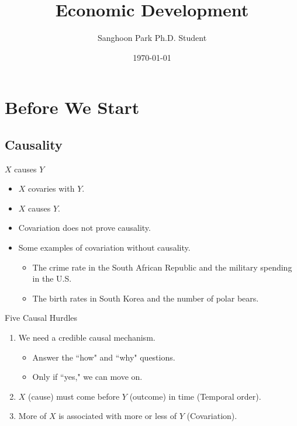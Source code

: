 \documentclass[xcolor=dvipsnames]{beamer}
\title{Economic Development}
\date{\today}
\author[Sanghoon Park]{Sanghoon Park \newline \newline  \footnotesize{Ph.D. Student}}
\institute[UofSC]{Department of Political Science}
\begin{document}

	
	\begin{frame}
		\titlepage
	\end{frame}
	\begin{frame}
		\tableofcontents
	\end{frame}

	
	\section{Before We Start}
	\subsection{Causality}
	\begin{frame}[fragile]{$X$ causes $Y$}
	\begin{itemize}
	  \item $X$ covaries with $Y$. \pause
	  \item $X$ causes $Y$. \pause
	  \item Covariation does not prove causality.
	  \item Some examples of covariation without causality.
	  \begin{itemize}
	    \item The crime rate in the South African Republic and the military spending in the U.S.
	    \item The birth rates in South Korea and the number of polar bears.
	   \end{itemize}
	\end{itemize}
	\end{frame}

	\begin{frame}[fragile]{Five Causal Hurdles}
	\begin{enumerate}
	  \item We need a credible causal mechanism.
	  \begin{itemize}
	    \item Answer the ``how" and ``why" questions.
	    \item Only if ``yes," we can move on.
	  \end{itemize}
	  \item $X$ (cause) must come before $Y$ (outcome) in time (Temporal order).
	  \item More of $X$ is associated with more or less of $Y$ (Covariation).
	\end{enumerate}
	\end{frame}
	
\end{document}
